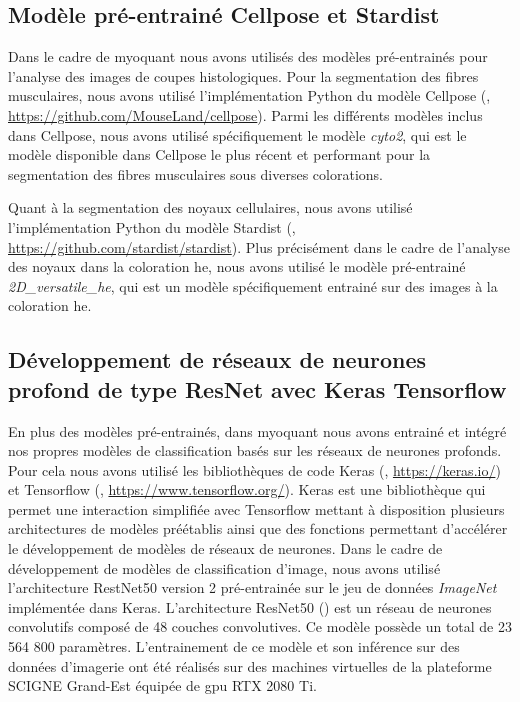 \subsection{Modèle pré-entrainé Cellpose et Stardist}
Dans le cadre de \gls{myoquant} nous avons utilisés des modèles pré-entrainés pour l'analyse des images de coupes histologiques. Pour la segmentation des fibres musculaires, nous avons utilisé l'implémentation Python du modèle Cellpose (\cite{stringer_cellpose_2021}, \url{https://github.com/MouseLand/cellpose}). Parmi les différents modèles inclus dans Cellpose, nous avons utilisé spécifiquement le modèle \textit{cyto2}, qui est le modèle disponible dans Cellpose le plus récent et performant pour la segmentation des fibres musculaires sous diverses colorations. 

Quant à la segmentation des noyaux cellulaires, nous avons utilisé l'implémentation Python du modèle Stardist (\cite{weigert_star-convex_2020}, \url{https://github.com/stardist/stardist}). Plus précisément dans le cadre de l'analyse des noyaux dans la coloration \gls{he}, nous avons utilisé le modèle pré-entrainé \textit{2D\_versatile\_he}, qui est un modèle spécifiquement entrainé sur des images à la coloration \gls{he}.

\subsection{Développement de réseaux de neurones profond de type ResNet avec Keras Tensorflow}
En plus des modèles pré-entrainés, dans \gls{myoquant} nous avons entrainé et intégré nos propres modèles de classification basés sur les réseaux de neurones profonds. Pour cela nous avons utilisé les bibliothèques de code Keras (\cite{chollet_keras_2015}, \url{https://keras.io/}) et Tensorflow (\cite{martin_abadi_tensorflow_2015}, \url{https://www.tensorflow.org/}). Keras est une bibliothèque qui permet une interaction simplifiée avec Tensorflow mettant à disposition plusieurs architectures de modèles préétablis ainsi que des fonctions permettant d'accélérer le développement de modèles de réseaux de neurones. Dans le cadre de développement de modèles de classification d'image, nous avons utilisé l'architecture RestNet50 version 2 pré-entrainée sur le jeu de données \textit{ImageNet} implémentée dans Keras. L'architecture ResNet50 (\cite{he_deep_2015}) est un réseau de neurones convolutifs composé de 48 couches convolutives. Ce modèle possède un total de 23 564 800 paramètres. L'entrainement de ce modèle et son inférence sur des données d'imagerie ont été réalisés sur des machines virtuelles de la plateforme SCIGNE Grand-Est équipée de \gls{gpu} RTX 2080 Ti.

